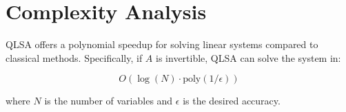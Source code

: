 \documentclass{article}
\begin{document}
\section{Complexity Analysis}

QLSA offers a polynomial speedup for solving linear systems compared to classical methods. Specifically, if \( A \) is invertible, QLSA can solve the system in:

\begin{equation}
O(\log(N) \cdot \text{poly}(1/\epsilon))
\end{equation}

where \( N \) is the number of variables and \( \epsilon \) is the desired accuracy.
\end{document}
